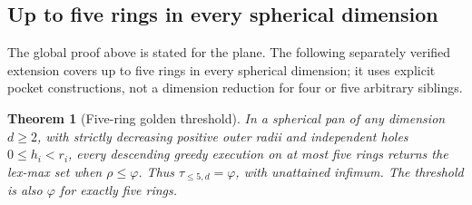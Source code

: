 \documentclass[11pt]{article}
\newtheorem{theorem}{Theorem}
\theoremstyle{definition}
\begin{document}
\subsection{Up to five rings in every spherical dimension}\label{sec:fivedim}

The global proof above is stated for the plane. The following separately
verified extension covers up to five rings in every spherical dimension;
it uses explicit pocket constructions, not a dimension reduction for
four or five arbitrary siblings.

\begin{theorem}[Five-ring golden threshold]\label{thm:five-dim}
In a spherical pan of any dimension $d\ge2$, with strictly decreasing
positive outer radii and independent holes $0\le h_i<r_i$, every
descending greedy execution on at most five rings returns the lex-max
set when $\rho\le\varphi$. Thus $\tau_{\le5,d}=\varphi$, with
unattained infimum. The threshold is also $\varphi$ for exactly five rings.
\end{theorem}
\end{document}
